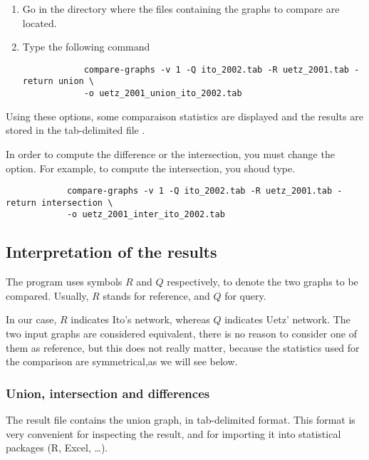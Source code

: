 \begin{enumerate}

\item 
	Go in the directory where the files containing the graphs to compare are 
	located. 

\item 
	Type the following command
	{\color{Blue} \begin{footnotesize} 
		\begin{verbatim}
			compare-graphs -v 1 -Q ito_2002.tab -R uetz_2001.tab -return union \ 
			-o uetz_2001_union_ito_2002.tab
		\end{verbatim} \end{footnotesize}
	}		
\end{enumerate}
Using these options, some comparaison statistics are displayed and the results are stored in the tab-delimited 
file \file{uetz\_2001\_union\_ito\_2002.tab}.

In order to compute the difference or the intersection, you must change the  option. For example, to compute the intersection, you shoud type. 
	{\color{Blue} \begin{footnotesize} 
		\begin{verbatim}
			compare-graphs -v 1 -Q ito_2002.tab -R uetz_2001.tab -return intersection \ 
			-o uetz_2001_inter_ito_2002.tab
		\end{verbatim} \end{footnotesize}
	}


\subsection{Interpretation of the results}

The program  uses symbols $R$ and $Q$
respectively, to denote the two graphs to be compared. Usually, $R$
stands for reference, and $Q$ for query. 

In our case, $R$ indicates Ito's network, whereas $Q$ indicates Uetz'
network. The two input graphs are considered equivalent, there is no
reason to consider one of them as reference, but this does not really
matter, because the statistics used for the comparison are
symmetrical,as we will see below.

\subsubsection{Union, intersection and differences}

The result file contains the union graph, in tab-delimited
format. This format is very convenient for inspecting the result, and
for importing it into statistical packages (R, Excel, \ldots).

